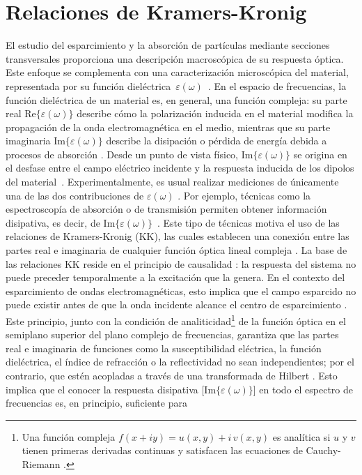 

\section{Relaciones de Kramers-Kronig}
\label{section:rKK}

El estudio del esparcimiento y la absorción de partículas mediante secciones transversales proporciona una descripción macroscópica de su respuesta óptica. Este enfoque se complementa con una caracterización microscópica del material, representada por su función dieléctrica~$\varepsilon(\omega)$~\cite{lucariniKramersKronigRelationsOptical2005}. En el espacio de frecuencias, la función dieléctrica de un material es, en general, una función compleja: su parte real $\text{Re}\{\varepsilon(\omega)\}$ describe cómo la polarización inducida en el material modifica la propagación de la onda electromagnética en el medio, mientras que su parte imaginaria $\text{Im}\{\varepsilon(\omega)\}$ describe la disipación o pérdida de energía debida a procesos de absorción \cite{maierPlasmonicsFundamentalsApplications2007}. Desde un punto de vista físico, $\text{Im}\{\varepsilon(\omega)\}$ se origina en el desfase entre el campo eléctrico incidente y la respuesta inducida de los dipolos del material~\cite{royHilbertTransformBrief2024}. Experimentalmente, es usual realizar mediciones de únicamente una de las dos contribuciones de $\varepsilon(\omega)$ \cite{terdaleIntensitymodulatedOpticalFiber2022,brindzaThinSampleRefractive2014,liuRealPartRefractive2015}. Por ejemplo, técnicas como la espectroscopía de absorción o de transmisión permiten obtener información disipativa, es decir, de $\text{Im}\{\varepsilon(\omega)\}$~\cite{lucariniKramersKronigRelationsOptical2005}. Este tipo de técnicas motiva el uso de las relaciones de Kramers-Kronig (KK), las cuales establecen una conexión  entre las partes real e imaginaria de cualquier función óptica lineal compleja \cite{lucariniKramersKronigRelationsOptical2005}. La base de las relaciones KK reside en el principio de causalidad \cite{lucariniKramersKronigRelationsOptical2005}: la respuesta del sistema no puede preceder temporalmente a la excitación que la genera. En el contexto del esparcimiento de ondas electromagnéticas, esto implica que el campo esparcido no puede existir antes de que la onda incidente alcance el centro de esparcimiento \cite{lucariniKramersKronigRelationsOptical2005}. Este principio, junto con la condición de analiticidad\footnote{Una función compleja $f(x+iy)=u(x,y)+i\,v(x,y)$ es analítica si $u$ y $v$ tienen primeras derivadas continuas y satisfacen las ecuaciones de Cauchy-Riemann \cite{arfkenMathematicalMethodsPhysicists2011}.} de la función óptica en el semiplano superior del plano complejo de frecuencias, garantiza que las partes real e imaginaria de funciones como la susceptibilidad eléctrica, la función dieléctrica, el índice de refracción o la reflectividad no sean independientes; por el contrario, que estén acopladas a través de una transformada de Hilbert \cite{lucariniKramersKronigRelationsOptical2005}. Esto implica que el conocer la respuesta disipativa [$\text{Im}\{\varepsilon(\omega)\}$] en todo el espectro de frecuencias es, en principio, suficiente para 
